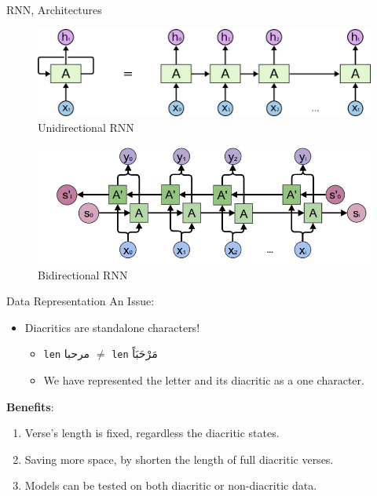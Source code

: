 \documentclass[10pt]{beamer}
\begin{document}
\begin{frame}[fragile]{RNN, Architectures}
\begin{figure}
\centering
\includegraphics[scale=0.3]{uni_rnn}
\caption{Unidirectional RNN}
\end{figure}

\begin{figure}
\centering
\includegraphics[scale=0.3]{bi}
\caption{Bidirectional RNN}
\end{figure}
\end{frame}

\begin{frame}[fragile]{Data Representation}
An Issue:
\begin{itemize}
    \item Diacritics are standalone characters!
    \begin{itemize}
        \item \texttt{len} \textarabic{مرحبا} $\neq$ \texttt{len} \textarabic{مَرْحَبَاً}
        \item We have represented the letter and its diacritic as a \alert{one character}.
    \end{itemize}
\end{itemize}
\textbf{Benefits}:
\begin{enumerate}
    \item Verse's length is fixed, regardless the diacritic states.
    \item Saving more space, by shorten the length of full diacritic verses. 
    \item Models can be tested on both diacritic or non-diacritic data.
\end{enumerate}
\end{frame}
\end{document}
